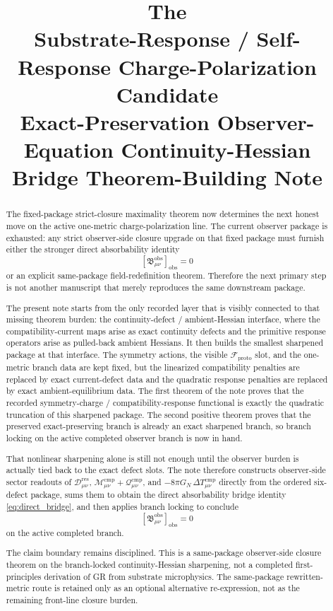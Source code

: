 \documentclass[11pt]{article}
\title{\textbf{The \TheoryName{}}\\[0.4em]
\large Substrate-Response / Self-Response Charge-Polarization Candidate\\
\large Exact-Preservation Observer-Equation Continuity-Hessian\\
\large Bridge Theorem-Building Note}
\author{}
\date{}
\newcommand{\ResidualDec}{\mathcal D_{\mu\nu}^{\mathrm{res}}}
\newcommand{\CompMix}{\mathcal M_{\mu\nu}^{\mathrm{cmp}}}
\newcommand{\CompQuad}{\mathcal Q_{\mu\nu}^{\mathrm{cmp}}}
\newcommand{\DeltaTComp}{\Delta T_{\mu\nu}^{\mathrm{cmp}}}
\newcommand{\ObsBurden}{\mathfrak B_{\mu\nu}^{\mathrm{obs}}}
\newcommand{\ObserverClass}[1]{\left[#1\right]_{\mathrm{obs}}}
\newcommand{\ProtoFunctional}{\mathscr F_{\mathrm{proto}}}
\begin{document}
\maketitle

\begin{abstract}
The fixed-package strict-closure maximality theorem now determines the next honest move on the active one-metric charge-polarization line. The current observer package is exhausted: any strict observer-side closure upgrade on that fixed package must furnish either the stronger direct absorbability identity
\[
\ObserverClass{\ObsBurden}=0
\]
or an explicit same-package field-redefinition theorem. Therefore the next primary step is not another manuscript that merely reproduces the same downstream package.

The present note starts from the only recorded layer that is visibly connected to that missing theorem burden: the continuity-defect / ambient-Hessian interface, where the compatibility-current maps arise as exact continuity defects and the primitive response operators arise as pulled-back ambient Hessians. It then builds the smallest sharpened package at that interface. The symmetry actions, the visible \(\ProtoFunctional\) slot, and the one-metric branch data are kept fixed, but the linearized compatibility penalties are replaced by exact current-defect data and the quadratic response penalties are replaced by exact ambient-equilibrium data. The first theorem of the note proves that the recorded symmetry-charge / compatibility-response functional is exactly the quadratic truncation of this sharpened package. The second positive theorem proves that the preserved exact-preserving branch is already an exact sharpened branch, so branch locking on the active completed observer branch is now in hand.

That nonlinear sharpening alone is still not enough until the observer burden is actually tied back to the exact defect slots. The note therefore constructs observer-side sector readouts of \(\ResidualDec\), \(\CompMix+\CompQuad\), and \(-8\pi G_N\,\DeltaTComp\) directly from the ordered six-defect package, sums them to obtain the direct absorbability bridge identity \eqref{eq:direct_bridge}, and then applies branch locking to conclude
\[
\ObserverClass{\ObsBurden}=0
\]
on the active completed branch.

The claim boundary remains disciplined. This is a same-package observer-side closure theorem on the branch-locked continuity-Hessian sharpening, not a completed first-principles derivation of GR from substrate microphysics. The same-package rewritten-metric route is retained only as an optional alternative re-expression, not as the remaining front-line closure burden.
\end{abstract}
\end{document}
